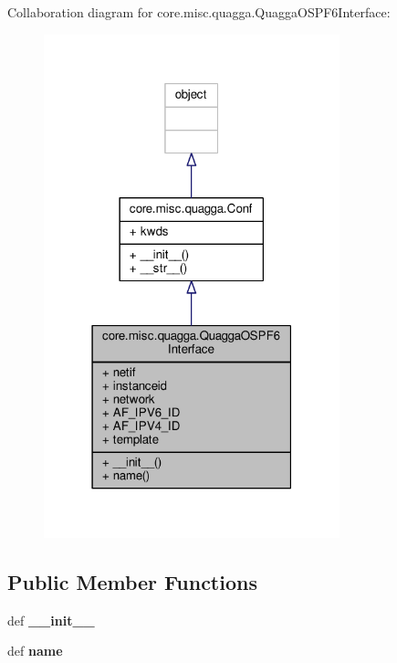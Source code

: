 Collaboration diagram for core.\+misc.\+quagga.\+Quagga\+O\+S\+P\+F6\+Interface\+:
\nopagebreak
\begin{figure}[H]
\begin{center}
\leavevmode
\includegraphics[width=243pt]{classcore_1_1misc_1_1quagga_1_1_quagga_o_s_p_f6_interface__coll__graph}
\end{center}
\end{figure}
\subsection*{Public Member Functions}
\begin{DoxyCompactItemize}
\item 
\hypertarget{classcore_1_1misc_1_1quagga_1_1_quagga_o_s_p_f6_interface_a8f21a33678aea8672107f410bb81591a}{def {\bfseries \+\_\+\+\_\+init\+\_\+\+\_\+}}\label{classcore_1_1misc_1_1quagga_1_1_quagga_o_s_p_f6_interface_a8f21a33678aea8672107f410bb81591a}

\item 
\hypertarget{classcore_1_1misc_1_1quagga_1_1_quagga_o_s_p_f6_interface_afe1ff031344fb0812f422f557522af22}{def {\bfseries name}}\label{classcore_1_1misc_1_1quagga_1_1_quagga_o_s_p_f6_interface_afe1ff031344fb0812f422f557522af22}

\end{DoxyCompactItemize}
